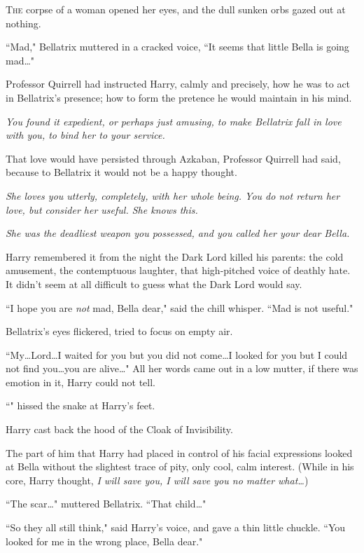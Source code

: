 
\lettrine{T}{he} corpse of a woman opened her eyes, and the dull sunken orbs gazed out at nothing.

``Mad," Bellatrix muttered in a cracked voice, ``It seems that little Bella is going mad…"

Professor Quirrell had instructed Harry, calmly and precisely, how he was to act in Bellatrix's presence; how to form the pretence he would maintain in his mind.

\emph{You found it expedient, or perhaps just amusing, to make Bellatrix fall in love with you, to bind her to your service.}

That love would have persisted through Azkaban, Professor Quirrell had said, because to Bellatrix it would not be a happy thought.

\emph{She loves you utterly, completely, with her whole being. You do not return her love, but consider her useful. She knows this.}

\emph{She was the deadliest weapon you possessed, and you called her your dear Bella.}

Harry remembered it from the night the Dark Lord killed his parents: the cold amusement, the contemptuous laughter, that high-pitched voice of deathly hate. It didn't seem at all difficult to guess what the Dark Lord would say.

``I hope you are \emph{not} mad, Bella dear," said the chill whisper. ``Mad is not useful."

Bellatrix's eyes flickered, tried to focus on empty air.

``My…Lord…I waited for you but you did not come…I looked for you but I could not find you…you are alive…" All her words came out in a low mutter, if there was emotion in it, Harry could not tell.

``" hissed the snake at Harry's feet.

Harry cast back the hood of the Cloak of Invisibility.

The part of him that Harry had placed in control of his facial expressions looked at Bella without the slightest trace of pity, only cool, calm interest. (While in his core, Harry thought, \emph{I will save you, I will save you no matter what…})

``The scar…" muttered Bellatrix. ``That child…"

``So they all still think," said Harry's voice, and gave a thin little chuckle. ``You looked for me in the wrong place, Bella dear."


